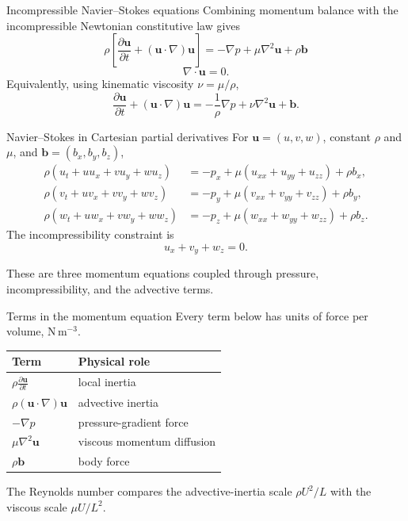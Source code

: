 \documentclass[aspectratio=169,11pt]{beamer}
\newcommand{\uvec}{\bm{u}}
\newcommand{\bvec}{\bm{b}}
\begin{document}
\begin{frame}{Incompressible Navier--Stokes equations}
Combining momentum balance with the incompressible Newtonian constitutive law gives
\[
\boxed{
  \rho\left[
  \frac{\partial\uvec}{\partial t}
  +(\uvec\cdot\nabla)\uvec
  \right]
  =-\nabla p+\mu\nabla^2\uvec+\rho\bvec
}
\]
\[
\boxed{\nabla\cdot\uvec=0}.
\]
Equivalently, using kinematic viscosity $\nu=\mu/\rho$,
\[
  \frac{\partial\uvec}{\partial t}
  +(\uvec\cdot\nabla)\uvec
  =-\frac{1}{\rho}\nabla p
  +\nu\nabla^2\uvec+\bvec.
\]
\end{frame}

\begin{frame}{Navier--Stokes in Cartesian partial derivatives}
For $\uvec=(u,v,w)$, constant $\rho$ and $\mu$, and $\bvec=(b_x,b_y,b_z)$,
\begin{align*}
\rho\left(u_t+u u_x+v u_y+w u_z\right)
&=-p_x+\mu(u_{xx}+u_{yy}+u_{zz})+\rho b_x,\\[4pt]
\rho\left(v_t+u v_x+v v_y+w v_z\right)
&=-p_y+\mu(v_{xx}+v_{yy}+v_{zz})+\rho b_y,\\[4pt]
\rho\left(w_t+u w_x+v w_y+w w_z\right)
&=-p_z+\mu(w_{xx}+w_{yy}+w_{zz})+\rho b_z.
\end{align*}
The incompressibility constraint is
\[
  u_x+v_y+w_z=0.
\]
\begin{punchbox}
\small These are three momentum equations coupled through pressure, incompressibility, and the advective terms.
\end{punchbox}
\end{frame}

\begin{frame}{Terms in the momentum equation}
Every term below has units of force per volume, $\mathrm{N\,m^{-3}}$.
\begin{center}
\renewcommand{\arraystretch}{1.35}
\begin{tabular}{ll}
\toprule
Term & Physical role \\
\midrule
$\displaystyle \rho\frac{\partial\uvec}{\partial t}$
& local inertia \\
$\displaystyle \rho(\uvec\cdot\nabla)\uvec$
& advective inertia \\
$\displaystyle -\nabla p$
& pressure-gradient force \\
$\displaystyle \mu\nabla^2\uvec$
& viscous momentum diffusion \\
$\displaystyle \rho\bvec$
& body force \\
\bottomrule
\end{tabular}
\end{center}
\begin{punchbox}
\centering
\small The Reynolds number compares the advective-inertia scale $\rho U^2/L$ with the viscous scale $\mu U/L^2$.
\end{punchbox}
\end{frame}
\end{document}
